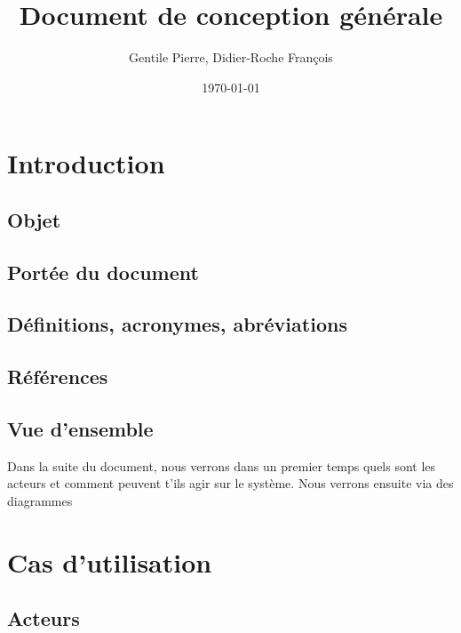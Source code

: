 \documentclass{article}
\author{Gentile Pierre, Didier-Roche François}
\date{\today}
\title{Document de conception générale}
\begin{document}
\maketitle

\newpage
\tableofcontents
\newpage


\section{Introduction}
\subsection{Objet}


\subsection{Portée du document}

\subsection{Définitions, acronymes, abréviations}

\subsection{Références}

\subsection{Vue d'ensemble}
Dans la suite du document, nous verrons dans un premier temps quels sont les acteurs et comment peuvent t'ils agir sur le système. Nous verrons ensuite via des diagrammes


\section{Cas d'utilisation}
\subsection{Acteurs}
\end{document}
